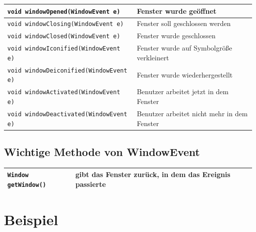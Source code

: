 \bgroup
\def\arraystretch{1.2}
\begin{tabular}{|l|l|}\hline
\lstinline|void windowOpened(WindowEvent e)| &
Fenster wurde geöffnet
\\ \hline
\lstinline|void windowClosing(WindowEvent e)| &
Fenster soll geschlossen werden
\\ \hline
\lstinline|void windowClosed(WindowEvent e)| &
Fenster wurde geschlossen
\\ \hline
\lstinline|void windowIconified(WindowEvent e)| &
Fenster wurde auf Symbolgröße verkleinert
\\ \hline
\lstinline|void windowDeiconified(WindowEvent e)| &
Fenster wurde wiederhergestellt
\\ \hline
\lstinline|void windowActivated(WindowEvent e)| &
Benutzer arbeitet jetzt in dem Fenster
\\ \hline
\lstinline|void windowDeactivated(WindowEvent e)| &
Benutzer arbeitet nicht mehr in dem Fenster
\\ \hline
\end{tabular}
\egroup

\subsection{Wichtige Methode von WindowEvent}

\bgroup
\def\arraystretch{1.2}
\begin{tabular}{|l|l|}\hline
\lstinline|Window getWindow()| &
gibt das Fenster zurück, in dem das Ereignis passierte
\\ \hline
\end{tabular}
\egroup
\section{Beispiel}

